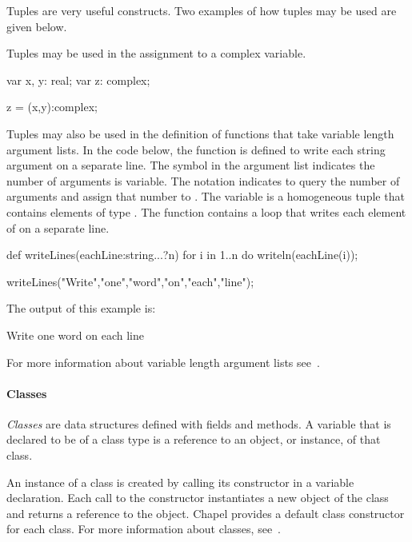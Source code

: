 Tuples are very useful constructs.  Two examples of how tuples
may be used are given below.

\begin{example}
Tuples may be used in the assignment to a complex variable.
\begin{chapel}
var x, y: real;
var z: complex;

z = (x,y):complex;
\end{chapel}
\end{example}

\begin{example}
Tuples may also be used in the definition of functions that
take variable length argument lists.  In the code below, 
the function  is defined to write each string
argument on a separate line.  The symbol  in the argument
list indicates the number of arguments is variable.  The notation  
indicates to query the number of arguments and assign that number
to .  The variable  is a homogeneous tuple
that contains  elements of type .  The
function contains a  loop that writes each element of
 on a separate line.

\begin{chapel}
def writeLines(eachLine:string...?n) {
  for i in 1..n do 
    writeln(eachLine(i));
}

writeLines("Write","one","word","on","each","line"); 
\end{chapel}

The output of this example is:
\begin{commandline}
Write
one
word
on
each
line
\end{commandline}
For more information about variable length argument lists 
see~.
\end{example}


\paragraph{Classes}
\emph{Classes} are data structures defined with fields and methods.
A variable that is declared to be of a class type is a reference
to an object, or instance, of that class. 
 
An instance of a class is created by calling its constructor
in a variable declaration.  Each call to the constructor
instantiates a new object of the class and returns a reference to 
the object.  Chapel provides a default class constructor for each class.
For more information about classes, see~.

